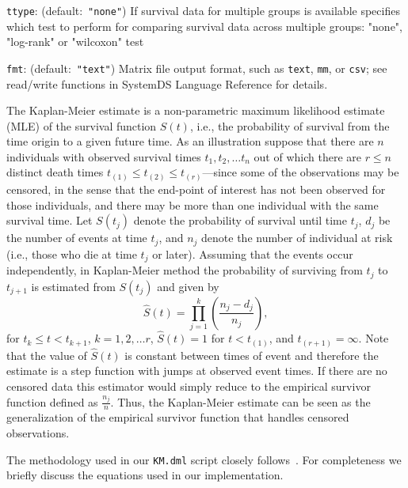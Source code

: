 \begin{Description}
\item[{\tt ttype}:](default:\mbox{ }{\tt "none"})
If survival data for multiple groups is available specifies which test to perform for comparing 
survival data across multiple groups: "none", "log-rank" or "wilcoxon" test
\item[{\tt fmt}:] (default:\mbox{ }{\tt "text"})
Matrix file output format, such as {\tt text}, {\tt mm}, or {\tt csv};
see read/write functions in SystemDS Language Reference for details.
\end{Description}


\smallskip

The Kaplan-Meier estimate is a non-parametric maximum likelihood estimate (MLE) of the survival function $S(t)$, i.e., the probability of survival from the time origin to a given future time. 
As an illustration suppose that there are $n$ individuals with observed survival times $t_1,t_2,\ldots t_n$ out of which there are $r\leq n$ distinct death times $t_{(1)}\leq t_{(2)}\leq t_{(r)}$---since some of the observations may be censored, in the sense that the end-point of interest has not been observed for those individuals, and there may be more than one individual with the same survival time.
Let $S(t_j)$ denote the probability of survival until time $t_j$, $d_j$ be the number of events at time $t_j$, and $n_j$ denote the number of individual at risk (i.e., those who die at time $t_j$ or later). 
Assuming that the events occur independently, in Kaplan-Meier method the probability of surviving from $t_j$ to $t_{j+1}$ is estimated from $S(t_j)$ and given by
\begin{equation*}
\hat{S}(t) = \prod_{j=1}^{k} \left( \frac{n_j-d_j}{n_j} \right),
\end{equation*}   
for $t_k\leq t<t_{k+1}$, $k=1,2,\ldots r$, $\hat{S}(t)=1$ for $t<t_{(1)}$, and $t_{(r+1)}=\infty$. 
Note that the value of $\hat{S}(t)$ is constant between times of event and therefore
the estimate is a step function with jumps at observed event times.
If there are no censored data this estimator would simply reduce to the empirical survivor function defined as $\frac{n_j}{n}$. Thus, the Kaplan-Meier estimate can be seen as the generalization of the empirical survivor function that handles censored observations.

The methodology used in our {\tt KM.dml} script closely follows~\cite[Sec.~2]{collett2003:kaplanmeier}.
For completeness we briefly discuss the equations used in our implementation.

